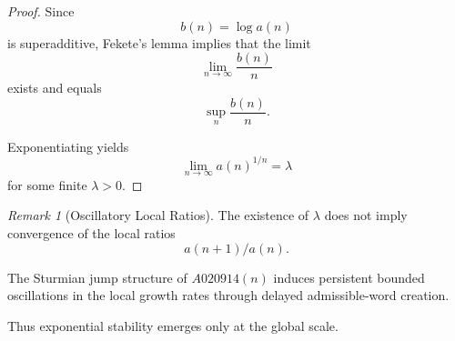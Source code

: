 \documentclass[12pt, oneside]{article}
\numberwithin{equation}{section}
\theoremstyle{definition}
\newtheorem{definition}{Definition}[section]
\theoremstyle{plain}
\newtheorem{lemma}[theorem]{Lemma}
\theoremstyle{remark}
\newtheorem*{remark}{Remark}
\begin{document}
\begin{proof}
Since
\[
b(n)=\log a(n)
\]
is superadditive, Fekete's lemma implies that the limit
\[
\lim_{n\to\infty}\frac{b(n)}{n}
\]
exists and equals
\[
\sup_n \frac{b(n)}{n}.
\]

Exponentiating yields
\[
\lim_{n\to\infty} a(n)^{1/n}
=
\lambda
\]
for some finite $\lambda>0$.
\end{proof}

\begin{remark}[Oscillatory Local Ratios]
The existence of $\lambda$ does not imply convergence of the local ratios
\[
a(n+1)/a(n).
\]

The Sturmian jump structure of $A020914(n)$ induces persistent bounded
oscillations in the local growth rates through delayed admissible-word
creation.

Thus exponential stability emerges only at the global scale.
\end{remark}





\end{document}
